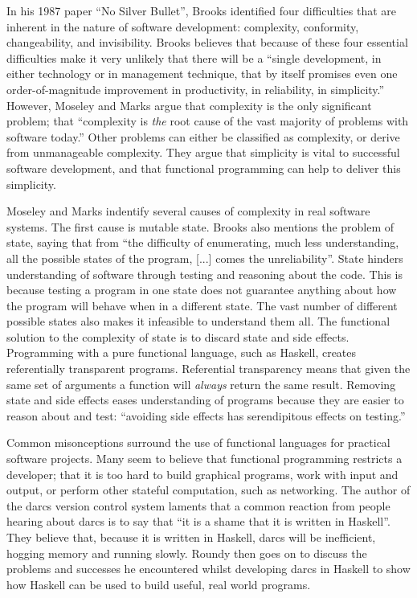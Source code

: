In his 1987 paper ``No Silver Bullet'', Brooks identified four difficulties that
are inherent in the nature of software development: complexity, conformity,
changeability, and invisibility.\cite{brooks1987bullet} Brooks believes that
because of these four essential difficulties make it very unlikely that there
will be a ``single development, in either technology or in management technique,
that by itself promises even one order-of-magnitude improvement in productivity,
in reliability, in simplicity.'' However, Moseley and Marks argue that complexity
is the only significant problem; that ``complexity is \emph{the} root cause of the
vast majority of problems with software today.''\cite{moseley2006tarpit} Other
problems can either be classified as complexity, or derive from unmanageable
complexity. They argue that simplicity is vital to successful software development,
and that functional programming can help to deliver this simplicity.

Moseley and Marks indentify several causes of complexity in real software systems.
The first cause is mutable state. Brooks also mentions the problem of state,
saying that from ``the difficulty of enumerating, much less understanding, all
the possible states of the program, [...] comes the unreliability''.\cite{brooks1987bullet}
State hinders understanding of software through testing and reasoning about the code.
This is because testing a program in one state does not guarantee anything about
how the program will behave when in a different state. The vast number of different
possible states also makes it infeasible to understand them all. The functional
solution to the complexity of state is to discard state and side effects.
Programming with a pure functional language, such as Haskell, creates referentially
transparent programs. Referential transparency means that given the same set of
arguments a function will \emph{always} return the same result. Removing state
and side effects eases understanding of programs because they are easier to
reason about and test: ``avoiding side effects has serendipitous effects on testing.''\cite{smallbone2011}




Common misonceptions surround the use of functional languages for practical
software projects. Many seem to believe that functional programming restricts
a developer; that it is too hard to build graphical programs, work with input
and output, or perform other stateful computation, such as networking.
The author of the darcs version control system laments that a common reaction
from people hearing about darcs is to say that ``it is a shame that it is
written in Haskell''.\cite{roundy2005darcs} They believe that, because it is
written in Haskell, darcs will be inefficient, hogging memory and running slowly.
Roundy then goes on to discuss the problems and successes he encountered whilst
developing darcs in Haskell to show how Haskell can be used to build useful, real
world programs.


